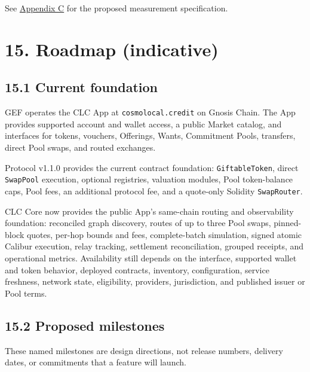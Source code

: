 \documentclass[11pt]{article}
\begin{document}
See \href{https://docs.cosmolocal.credit/white-paper/appendix-c-kpi-definitions}{Appendix C} for the proposed measurement specification.


\section*{15. Roadmap (indicative)}

\subsection*{15.1 Current foundation}

GEF operates the CLC App at \texttt{cosmolocal.credit} on Gnosis Chain. The App provides supported account and wallet access, a public Market catalog, and interfaces for tokens, vouchers, Offerings, Wants, Commitment Pools, transfers, direct Pool swaps, and routed exchanges.

Protocol v1.1.0 provides the current contract foundation: \texttt{GiftableToken}, direct \texttt{SwapPool} execution, optional registries, valuation modules, Pool token-balance caps, Pool fees, an additional protocol fee, and a quote-only Solidity \texttt{SwapRouter}.

CLC Core now provides the public App's same-chain routing and observability foundation: reconciled graph discovery, routes of up to three Pool swaps, pinned-block quotes, per-hop bounds and fees, complete-batch simulation, signed atomic Calibur execution, relay tracking, settlement reconciliation, grouped receipts, and operational metrics. Availability still depends on the interface, supported wallet and token behavior, deployed contracts, inventory, configuration, service freshness, network state, eligibility, providers, jurisdiction, and published issuer or Pool terms.

\subsection*{15.2 Proposed milestones}

These named milestones are design directions, not release numbers, delivery dates, or commitments that a feature will launch.
\end{document}
